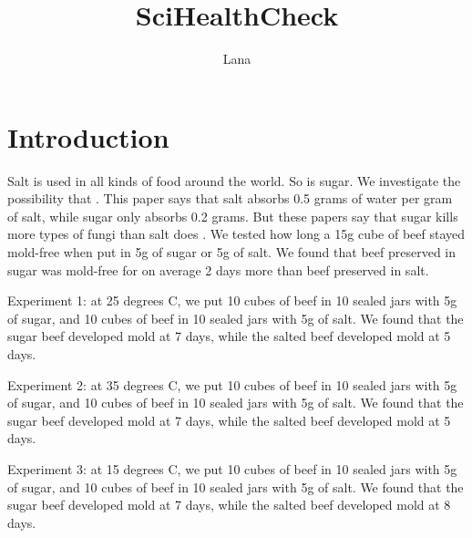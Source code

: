\documentclass{article}
\title{SciHealthCheck}
\author{Lana}
\date{ }
\begin{document}
\maketitle

\section{Introduction}
Salt is used in all kinds of food around the world. So is sugar.  We investigate the possibility that .
This paper says that salt absorbs 0.5 grams of water per gram of salt, while sugar only absorbs 0.2 grams. But these papers say that sugar kills more types of fungi than salt does
.
We tested how long a 15g cube of beef stayed mold-free when put in 5g of sugar or 5g of salt. We found that beef preserved in sugar was mold-free for on average 2 days more than beef preserved in salt.

Experiment 1: at 25 degrees C, we put 10 cubes of beef in 10 sealed jars with 5g of sugar, and 10 cubes of beef in 10 sealed jars with 5g of salt.
 We found that the sugar beef developed mold at 7 days, while the salted beef developed mold at 5 days.

Experiment 2: at 35 degrees C, we put 10 cubes of beef in 10 sealed jars with 5g of sugar, and 10 cubes of beef in 10 sealed jars with 5g of salt.
 We found that the sugar beef developed mold at 7 days, while the salted beef developed mold at 5 days.

Experiment 3: at 15 degrees C, we put 10 cubes of beef in 10 sealed jars with 5g of sugar, and 10 cubes of beef in 10 sealed jars with 5g of salt.
 We found that the sugar beef developed mold at 7 days, while the salted beef developed mold at 8 days.





\footnotesize{


}

\clearpage
\printhealthcheck
\end{document}
